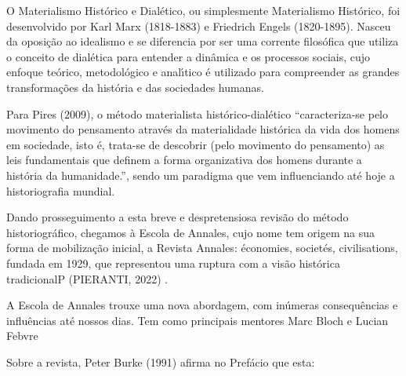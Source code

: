 \documentclass[
12pt,		%
openright,	%
twoside,  %
a4paper,			%
chapter=TITLE,		%
english,			%
french,				%
spanish,			%
brazil				%
]{USPSC-classe/USPSC_RedarTex}
\begin{document}
O Materialismo Hist\'orico e Dial\'etico, ou simplesmente Materialismo Hist\'orico, foi desenvolvido  por Karl Marx (1818-1883) e Friedrich Engels (1820-1895). Nasceu da oposi\c{c}\~ao ao idealismo e se diferencia por ser uma corrente filos\'ofica que utiliza o conceito de dial\'etica para entender a din\^amica e os processos sociais, cujo enfoque te\'orico, metodol\'ogico e anal\'{\i}tico \'e utilizado para compreender as grandes transforma\c{c}\~oes da hist\'oria e das sociedades humanas.










Para  Pires (2009), o m\'etodo materialista hist\'orico-dial\'etico “caracteriza-se pelo movimento do pensamento atrav\'es da materialidade hist\'orica da vida dos homens em sociedade, isto \'e, trata-se de descobrir (pelo movimento do pensamento) as leis fundamentais que definem a forma organizativa dos homens durante a hist\'oria da humanidade.”, sendo um paradigma que vem influenciando at\'e hoje a historiografia mundial.










Dando prosseguimento a esta breve e despretensiosa revis\~ao do m\'etodo historiogr\'afico, chegamos \`a Escola de Annales, cujo nome tem origem na sua forma de mobiliza\c{c}\~ao inicial, a Revista Annales: \'economies, societ\'es, civilisations, fundada em 1929, que representou uma ruptura com a vis\~ao hist\'orica tradicionalP (PIERANTI, 2022) .










A Escola de Annales trouxe uma nova abordagem, com in\'umeras consequ\^encias e influ\^encias at\'e nossos dias. Tem como principais mentores  Marc Bloch e Lucian Febvre










Sobre a revista, Peter Burke (1991) afirma no Pref\'acio que esta:
\end{document}
